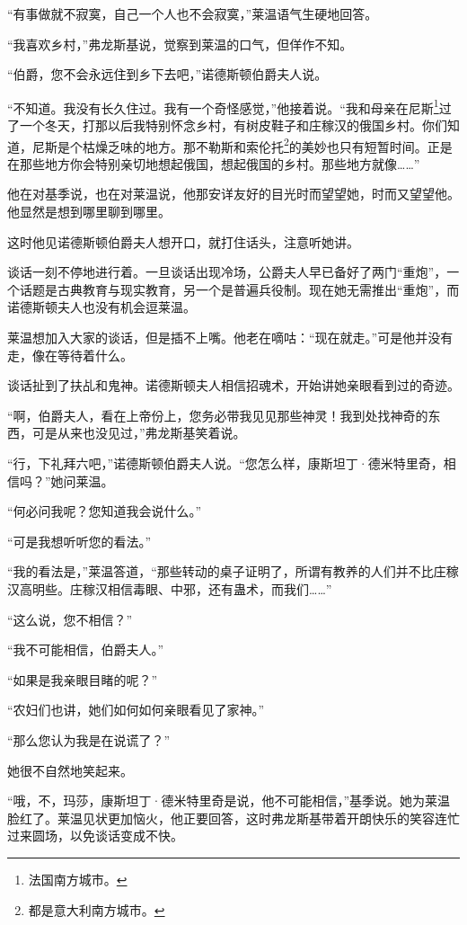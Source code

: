 \par “有事做就不寂寞，自己一个人也不会寂寞，”莱温语气生硬地回答。
\par “我喜欢乡村，”弗龙斯基说，觉察到莱温的口气，但佯作不知。
\par “伯爵，您不会永远住到乡下去吧，”诺德斯顿伯爵夫人说。
\par “不知道。我没有长久住过。我有一个奇怪感觉，”他接着说。“我和母亲在尼斯\footnote{法国南方城市。}过了一个冬天，打那以后我特别怀念乡村，有树皮鞋子和庄稼汉的俄国乡村。你们知道，尼斯是个枯燥乏味的地方。那不勒斯和索伦托\footnote{都是意大利南方城市。}的美妙也只有短暂时间。正是在那些地方你会特别亲切地想起俄国，想起俄国的乡村。那些地方就像……”
\par 他在对基季说，也在对莱温说，他那安详友好的目光时而望望她，时而又望望他。他显然是想到哪里聊到哪里。
\par 这时他见诺德斯顿伯爵夫人想开口，就打住话头，注意听她讲。
\par 谈话一刻不停地进行着。一旦谈话出现冷场，公爵夫人早已备好了两门“重炮”，一个话题是古典教育与现实教育，另一个是普遍兵役制。现在她无需推出“重炮”，而诺德斯顿夫人也没有机会逗莱温。
\par 莱温想加入大家的谈话，但是插不上嘴。他老在嘀咕：“现在就走。”可是他并没有走，像在等待着什么。
\par 谈话扯到了扶乩和鬼神。诺德斯顿夫人相信招魂术，开始讲她亲眼看到过的奇迹。
\par “啊，伯爵夫人，看在上帝份上，您务必带我见见那些神灵！我到处找神奇的东西，可是从来也没见过，”弗龙斯基笑着说。
\par “行，下礼拜六吧，”诺德斯顿伯爵夫人说。“您怎么样，康斯坦丁·德米特里奇，相信吗？”她问莱温。
\par “何必问我呢？您知道我会说什么。”
\par “可是我想听听您的看法。”
\par “我的看法是，”莱温答道，“那些转动的桌子证明了，所谓有教养的人们并不比庄稼汉高明些。庄稼汉相信毒眼、中邪，还有蛊术，而我们……”
\par “这么说，您不相信？”
\par “我不可能相信，伯爵夫人。”
\par “如果是我亲眼目睹的呢？”
\par “农妇们也讲，她们如何如何亲眼看见了家神。”
\par “那么您认为我是在说谎了？”
\par 她很不自然地笑起来。
\par “哦，不，玛莎，康斯坦丁·德米特里奇是说，他不可能相信，”基季说。她为莱温脸红了。莱温见状更加恼火，他正要回答，这时弗龙斯基带着开朗快乐的笑容连忙过来圆场，以免谈话变成不快。
